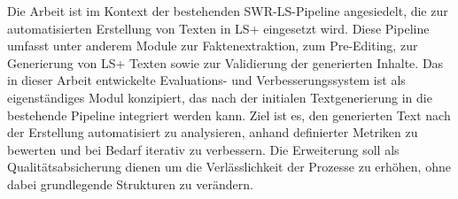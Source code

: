 Die Arbeit ist im Kontext der bestehenden SWR-LS-Pipeline angesiedelt, die zur automatisierten Erstellung von Texten in LS+ eingesetzt wird. 
Diese Pipeline umfasst unter anderem Module zur Faktenextraktion, zum Pre-Editing, zur Generierung von LS+ Texten sowie zur Validierung der generierten Inhalte.
Das in dieser Arbeit entwickelte Evaluations- und Verbesserungssystem ist als eigenständiges Modul konzipiert, das nach der initialen Textgenerierung in die bestehende Pipeline integriert werden kann. 
Ziel ist es, den generierten Text nach der Erstellung automatisiert zu analysieren, anhand definierter Metriken zu bewerten und bei Bedarf iterativ zu verbessern.
Die Erweiterung soll als Qualitätsabsicherung dienen um die Verlässlichkeit der Prozesse zu erhöhen, ohne dabei grundlegende Strukturen zu verändern.